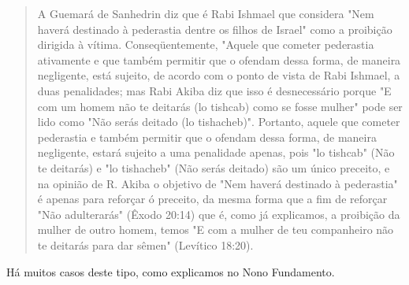 \begin{quote}
A Guemará de Sanhedrin diz que é Rabi Ishmael que considera "Nem haverá
destinado à pederastia dentre os filhos de Israel" como a proibição
diri­gida à vítima. Conseqüentemente, "Aquele que cometer pederastia
ativamen­te e que também permitir que o ofendam dessa forma, de maneira
negligente, está sujeito, de acordo com o ponto de vista de Rabi
Ishmael, a duas penalida­des; mas Rabi Akiba diz que isso é
desnecessário porque "E com um homem não te deitarás (lo tishcab) como
se fosse mulher" pode ser lido como "Não serás deitado (lo tishacheb)".
Portanto, aquele que cometer pederastia e também permitir que
o ofendam dessa forma, de maneira negligente, estará
sujeito a uma penalidade apenas, pois "lo tishcab" (Não te deitarás) e
"lo tishacheb" (Não serás deitado) são um único preceito, e na opinião
de R. Akiba o objetivo de "Nem haverá destinado à pederastia" é apenas
para reforçar ó preceito, da mesma forma que a fim de reforçar "Não
adulterarás" (Êxodo 20:14) que é, como já explicamos, a proibição da
mulher de outro homem, temos "E com a mulher de teu companheiro não te
deitarás para dar sêmen" (Levítico 18:20).
\end{quote}

Há muitos casos deste tipo, como explicamos no Nono Fundamento.


